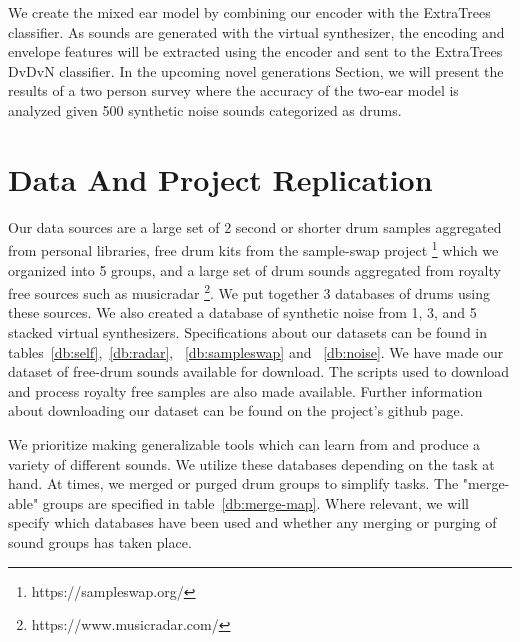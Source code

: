 \documentclass[\main/thesis.tex]{subfiles}
\begin{document}
We create the mixed ear model by combining our encoder with the ExtraTrees classifier. As sounds are generated with the virtual synthesizer, the encoding and envelope features will be extracted using the encoder and sent to the ExtraTrees DvDvN classifier. In the upcoming novel generations Section, we will present the results of a two person survey where the accuracy of the two-ear model is analyzed given 500 synthetic noise sounds categorized as drums. 



\section{Data And Project Replication}

Our data sources are a large set of 2 second or shorter drum samples aggregated from personal libraries, free drum kits from the sample-swap project \footnote{https://sampleswap.org/} which we organized into 5 groups, and a large set of drum sounds aggregated from royalty free sources such as musicradar \footnote{https://www.musicradar.com/}. We put together 3 databases of drums using these sources. We also created a database of synthetic noise from 1, 3, and 5 stacked virtual synthesizers. Specifications about our datasets can be found in tables~\ref{db:self},~\ref{db:radar}, ~\ref{db:sampleswap} and ~\ref{db:noise}. We have made our dataset of free-drum sounds available for download. The scripts used to download and process royalty free samples are also made available. Further information about downloading our dataset can be found on the project's github page. 

We prioritize making generalizable tools which can learn from and produce a variety of different sounds. We utilize these databases depending on the task at hand. At times, we merged or purged drum groups to simplify tasks. The "merge-able" groups are specified in table~\ref{db:merge-map}. Where relevant, we will specify which databases have been used and whether any merging or purging of sound groups has taken place. 

\end{document}
